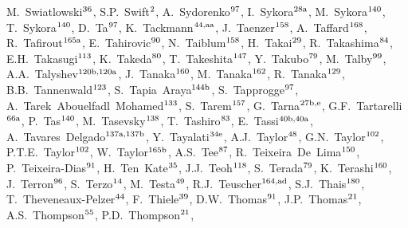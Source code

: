 \begin{flushleft}
M.~Swiatlowski$^\textrm{\scriptsize 36}$,    
S.P.~Swift$^\textrm{\scriptsize 2}$,    
A.~Sydorenko$^\textrm{\scriptsize 97}$,    
I.~Sykora$^\textrm{\scriptsize 28a}$,    
M.~Sykora$^\textrm{\scriptsize 140}$,    
T.~Sykora$^\textrm{\scriptsize 140}$,    
D.~Ta$^\textrm{\scriptsize 97}$,    
K.~Tackmann$^\textrm{\scriptsize 44,aa}$,    
J.~Taenzer$^\textrm{\scriptsize 158}$,    
A.~Taffard$^\textrm{\scriptsize 168}$,    
R.~Tafirout$^\textrm{\scriptsize 165a}$,    
E.~Tahirovic$^\textrm{\scriptsize 90}$,    
N.~Taiblum$^\textrm{\scriptsize 158}$,    
H.~Takai$^\textrm{\scriptsize 29}$,    
R.~Takashima$^\textrm{\scriptsize 84}$,    
E.H.~Takasugi$^\textrm{\scriptsize 113}$,    
K.~Takeda$^\textrm{\scriptsize 80}$,    
T.~Takeshita$^\textrm{\scriptsize 147}$,    
Y.~Takubo$^\textrm{\scriptsize 79}$,    
M.~Talby$^\textrm{\scriptsize 99}$,    
A.A.~Talyshev$^\textrm{\scriptsize 120b,120a}$,    
J.~Tanaka$^\textrm{\scriptsize 160}$,    
M.~Tanaka$^\textrm{\scriptsize 162}$,    
R.~Tanaka$^\textrm{\scriptsize 129}$,    
B.B.~Tannenwald$^\textrm{\scriptsize 123}$,    
S.~Tapia~Araya$^\textrm{\scriptsize 144b}$,    
S.~Tapprogge$^\textrm{\scriptsize 97}$,    
A.~Tarek~Abouelfadl~Mohamed$^\textrm{\scriptsize 133}$,    
S.~Tarem$^\textrm{\scriptsize 157}$,    
G.~Tarna$^\textrm{\scriptsize 27b,e}$,    
G.F.~Tartarelli$^\textrm{\scriptsize 66a}$,    
P.~Tas$^\textrm{\scriptsize 140}$,    
M.~Tasevsky$^\textrm{\scriptsize 138}$,    
T.~Tashiro$^\textrm{\scriptsize 83}$,    
E.~Tassi$^\textrm{\scriptsize 40b,40a}$,    
A.~Tavares~Delgado$^\textrm{\scriptsize 137a,137b}$,    
Y.~Tayalati$^\textrm{\scriptsize 34e}$,    
A.J.~Taylor$^\textrm{\scriptsize 48}$,    
G.N.~Taylor$^\textrm{\scriptsize 102}$,    
P.T.E.~Taylor$^\textrm{\scriptsize 102}$,    
W.~Taylor$^\textrm{\scriptsize 165b}$,    
A.S.~Tee$^\textrm{\scriptsize 87}$,    
R.~Teixeira~De~Lima$^\textrm{\scriptsize 150}$,    
P.~Teixeira-Dias$^\textrm{\scriptsize 91}$,    
H.~Ten~Kate$^\textrm{\scriptsize 35}$,    
J.J.~Teoh$^\textrm{\scriptsize 118}$,    
S.~Terada$^\textrm{\scriptsize 79}$,    
K.~Terashi$^\textrm{\scriptsize 160}$,    
J.~Terron$^\textrm{\scriptsize 96}$,    
S.~Terzo$^\textrm{\scriptsize 14}$,    
M.~Testa$^\textrm{\scriptsize 49}$,    
R.J.~Teuscher$^\textrm{\scriptsize 164,ad}$,    
S.J.~Thais$^\textrm{\scriptsize 180}$,    
T.~Theveneaux-Pelzer$^\textrm{\scriptsize 44}$,    
F.~Thiele$^\textrm{\scriptsize 39}$,    
D.W.~Thomas$^\textrm{\scriptsize 91}$,    
J.P.~Thomas$^\textrm{\scriptsize 21}$,    
A.S.~Thompson$^\textrm{\scriptsize 55}$,    
P.D.~Thompson$^\textrm{\scriptsize 21}$,    

\end{flushleft}
